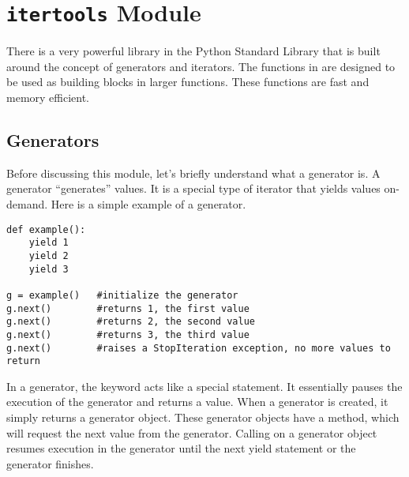 \section*{\texttt{itertools} Module}
There is a very powerful library in the Python Standard Library that is built around the concept
of generators and iterators.  The functions in  are designed to be used as
building blocks in larger functions.  These functions are fast and memory efficient.

\subsection*{Generators}
Before discussing this module, let's briefly understand what a generator is.
A generator ``generates'' values.  It is a special type of iterator that yields values on-demand.  Here is a simple example of a generator.
\begin{lstlisting}
def example():
    yield 1
    yield 2
    yield 3
    
g = example()   #initialize the generator
g.next()        #returns 1, the first value
g.next()        #returns 2, the second value
g.next()        #returns 3, the third value
g.next()        #raises a StopIteration exception, no more values to return
\end{lstlisting}
In a generator, the  keyword acts like a special  statement.  
It essentially pauses the execution of the generator and returns a value.
When a generator is created, it simply returns a generator object.
These generator objects have a  method, which will request the next value from the generator.
Calling  on a generator object resumes execution in the generator until the next yield statement or the generator finishes.

